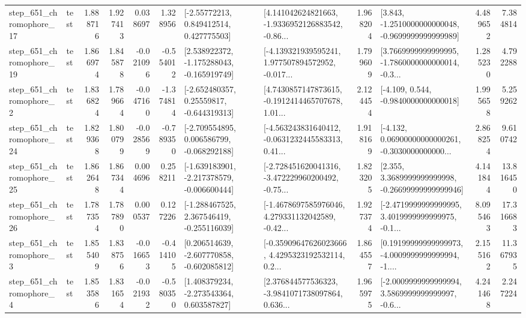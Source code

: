 \begin{tabular}{llrrrrllrlrr}
  step\_651\_chromophore\_17 &      test &      1.888716 &    1.927413 &      0.038697 &  1.328956 &     [-2.55772213, 0.849412514, 0.427775503] &  [4.141042624821663, -1.9336952126883542, -0.86... &       1.968204 &  [3.843, -1.2510000000000048, -0.9699999999999989] &            4.489652 &          7.384814 \\
  step\_651\_chromophore\_19 &      test &      1.866974 &    1.845878 &     -0.021096 & -0.554012 &   [2.538922372, -1.175288043, -0.165919749] &  [-4.139321939595241, 1.977507894572952, -0.017... &       1.799609 &  [3.7669999999999995, -1.7860000000000014, -0.3... &            1.285230 &          4.792288 \\
   step\_651\_chromophore\_2 &      test &      1.836824 &    1.789664 &     -0.047160 & -1.374814 &    [-2.652480357, 0.25559817, -0.644319313] &  [4.7430857147873615, -0.1912414465707678, 1.01... &       2.124454 &               [-4.109, 0.544, -0.9840000000000018] &            1.995658 &          5.259262 \\
  step\_651\_chromophore\_24 &      test &      1.829368 &    1.800799 &     -0.028569 & -0.789350 &   [-2.709554895, 0.006586799, -0.068292188] &  [-4.563243831640412, -0.0631232445583313, 0.41... &       1.918169 &  [-4.132, 0.06900000000000261, -0.3030000000000... &            2.868254 &          9.610742 \\
  step\_651\_chromophore\_25 &      test &      1.862648 &    1.867344 &      0.004696 &  0.258211 &  [-1.639183901, -2.217378579, -0.006600444] &  [-2.728451620041316, -3.472229960200492, -0.75... &       1.823205 &  [2.355, 3.3689999999999998, -0.26699999999999946] &            4.141844 &         13.816450 \\
  step\_651\_chromophore\_26 &      test &      1.787354 &    1.787890 &      0.000537 &  0.127226 &   [-1.288467525, 2.367546419, -0.255116039] &  [-1.4678697585976046, 4.279331132042589, -0.42... &       1.927374 &  [-2.4719999999999995, 3.4019999999999975, -0.1... &            8.095463 &         17.316683 \\
   step\_651\_chromophore\_3 &      test &      1.855409 &    1.838756 &     -0.016653 & -0.414105 &   [0.206514639, -2.607770858, -0.602085812] &  [-0.35909647626023666, 4.4295323192532114, 0.2... &       1.864557 &  [0.19199999999999973, -4.0009999999999994, -1.... &            2.155162 &         11.367935 \\
   step\_651\_chromophore\_4 &      test &      1.853586 &    1.831654 &     -0.021932 & -0.580350 &    [1.408379234, -2.273543364, 0.603587827] &  [2.376844577536323, -3.9841071738097864, 0.636... &       1.965975 &  [-2.0009999999999994, 3.5869999999999997, -0.6... &            4.241468 &          2.247224 \\

\end{tabular}
